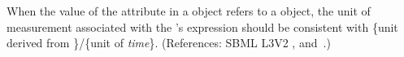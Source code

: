 When the value of the attribute  in a \RateRule object
refers to a \SpeciesReference object, the unit of measurement associated
with the \RateRule's  expression should be consistent with
\{unit derived from \}/\{unit of \emph{time}\}.
(References: SBML L3V2 ,
 and~.)
